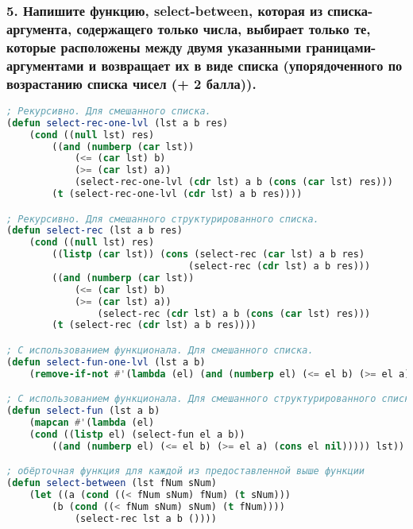 \subsubsection*{5. Напишите функцию, select-between, которая из списка-аргумента, содержащего только числа, выбирает только те, которые расположены между двумя указанными границами-аргументами и возвращает их в виде списка (упорядоченного по возрастанию списка чисел (+ 2 балла)).}
\begin{lstlisting}[language=Lisp]
; Рекурсивно. Для смешанного списка.	
(defun select-rec-one-lvl (lst a b res)
	(cond ((null lst) res)
		((and (numberp (car lst)) 
			(<= (car lst) b) 
			(>= (car lst) a)) 
			(select-rec-one-lvl (cdr lst) a b (cons (car lst) res)))
		(t (select-rec-one-lvl (cdr lst) a b res))))

; Рекурсивно. Для смешанного структурированного списка.
(defun select-rec (lst a b res)
	(cond ((null lst) res)
		((listp (car lst)) (cons (select-rec (car lst) a b res)
								(select-rec (cdr lst) a b res)))
		((and (numberp (car lst))
			(<= (car lst) b) 
			(>= (car lst) a)) 
				(select-rec (cdr lst) a b (cons (car lst) res)))
		(t (select-rec (cdr lst) a b res))))

; С использованием функционала. Для смешанного списка.
(defun select-fun-one-lvl (lst a b)
	(remove-if-not #'(lambda (el) (and (numberp el) (<= el b) (>= el a))) lst))

; С использованием функционала. Для смешанного структурированного списка.
(defun select-fun (lst a b)
	(mapcan #'(lambda (el) 
	(cond ((listp el) (select-fun el a b))
		((and (numberp el) (<= el b) (>= el a) (cons el nil))))) lst))

; обёрточная функция для каждой из предоставленной выше функции
(defun select-between (lst fNum sNum)
	(let ((a (cond ((< fNum sNum) fNum) (t sNum)))
		(b (cond ((< fNum sNum) sNum) (t fNum))))
			(select-rec lst a b ()))) 
\end{lstlisting}

\newpage
